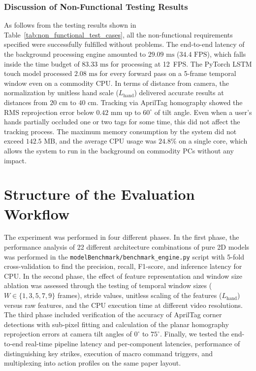 \subsubsection{Discussion of Non-Functional Testing Results}
\label{subsubsec:test_non_functional_narrative}
As follows from the testing results shown in Table~\ref{tab:non_functional_test_cases}, all the non-functional requirements specified were successfully fulfilled without problems. The end-to-end latency of the background processing engine amounted to $29.09\text{ ms}$ ($34.4\text{ FPS}$), which falls inside the time budget of $83.33\text{ ms}$ for processing at 12~FPS. The PyTorch LSTM touch model processed $2.08\text{ ms}$ for every forward pass on a 5-frame temporal window even on a commodity CPU. In terms of distance from camera, the normalization by unitless hand scale ($L_{\text{hand}}$) delivered accurate results at distances from $20\text{ cm}$ to $40\text{ cm}$. Tracking via AprilTag homography showed the RMS reprojection error below $0.42\text{ mm}$ up to $60^\circ$ of tilt angle. Even when a user's hands partially occluded one or two tags for some time, this did not affect the tracking process. The maximum memory consumption by the system did not exceed $142.5\text{ MB}$, and the average CPU usage was $24.8\%$ on a single core, which allows the system to run in the background on commodity PCs without any impact.

\section{Structure of the Evaluation Workflow}
\label{sec:test_workflow}
The experiment was performed in four different phases. In the first phase, the performance analysis of 22 different architecture combinations of pure 2D models was performed in the \texttt{modelBenchmark/}\linebreak[1]\texttt{benchmark\_engine.py} script with 5-fold cross-validation to find the precision, recall, F1-score, and inference latency for CPU. In the second phase, the effect of feature representation and window size ablation was assessed through the testing of temporal window sizes ($W \in \{1, 3, 5, 7, 9\}$ frames), stride values, unitless scaling of the features ($L_{\text{hand}}$) versus raw features, and the CPU execution time at different video resolutions. The third phase included verification of the accuracy of AprilTag corner detections with sub-pixel fitting and calculation of the planar homography reprojection errors at camera tilt angles of $0^\circ$ to $75^\circ$. Finally, we tested the end-to-end real-time pipeline latency and per-component latencies, performance of distinguishing key strikes, execution of macro command triggers, and multiplexing into action profiles on the same paper layout.

